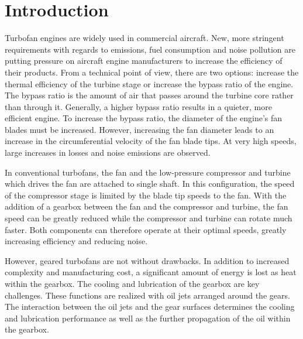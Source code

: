\cleardoublepage


\chapter{Introduction}
\label{Chapter: Introduction}

Turbofan engines are widely used in commercial aircraft.  New, more stringent requirements with regards to emissions, fuel consumption and noise pollution are putting pressure on aircraft engine manufacturers to increase the efficiency of their products. From a technical point of view, there are two options: increase the thermal efficiency of the turbine stage or increase the bypass ratio of the engine. The bypass ratio is the amount of air that passes around the turbine core rather than through it.  Generally, a higher bypass ratio results in a quieter, more efficient engine. To increase the bypass ratio, the diameter of the engine's fan blades must be increased.  However, increasing the fan diameter leads to an increase in the circumferential velocity of the fan blade tips.  At very high speeds, large increases in losses and noise emissions are observed.

In conventional turbofans, the fan and the low-pressure compressor and turbine which drives the fan are attached to single shaft.  In this configuration, the speed of the compressor stage is limited by the blade tip speeds to the fan.  With the addition of a gearbox between the fan and the compressor and turbine, the fan speed can be greatly reduced while the compressor and turbine can rotate much faster.  Both components can therefore operate at their optimal speeds, greatly increasing efficiency and reducing noise.

However, geared turbofans are not without drawbacks.  In addition to increased complexity and manufacturing cost, a significant amount of energy is lost as heat within the gearbox.  The cooling and lubrication of the gearbox are key challenges.  These functions are realized with oil jets arranged around the gears.  The interaction between the oil jets and the gear surfaces determines the cooling and lubrication performance as well as the further propagation of the oil within the gearbox.

